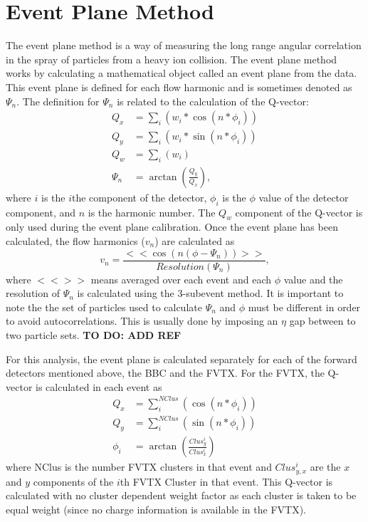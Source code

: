 \section{Event Plane Method}
The event plane method is a way of measuring the long range angular correlation in the spray of particles from a heavy ion collision. The event plane method works by calculating a mathematical object called an event plane
from the data. This event plane is defined for each flow harmonic and is sometimes denoted as $\Psi_n$. The definition for $\Psi_n$ is related to the calculation of the Q-vector:
\begin{align}
Q_x &= \sum_i( w_i * \cos(n * \phi_i)) \\
Q_y &= \sum_i( w_i * \sin(n * \phi_i)) \\
Q_w &= \sum_i( w_i ) \\
\Psi_n &= \arctan( \frac{Q_y}{Q_x} ),
\label{eqn:general_ep_math}
\end{align}
where $i$ is the $i$the component of the detector, $\phi_i$ is the $\phi$ value of the detector component, and $n$ is the harmonic number.
The $Q_w$ component of the Q-vector is only used during the event plane calibration.
Once the event plane has been calculated, the flow harmonics ($v_n$) are calculated as
\begin{equation}
v_n = \frac{<<\cos(n(\phi - \Psi_n))>>}{Resolution(\Psi_n)},
\end{equation}
where $<<>>$ means averaged over each event and each $\phi$ value and the resolution of $\Psi_n$ is calculated using the 3-subevent method. It is important to note the the set of particles used to calculate $\Psi_n$ and $\phi$ must be different in order to avoid
autocorrelations. This is usually done by imposing an $\eta$ gap between to two particle sets. \textbf{TO DO: ADD REF}

For this analysis, the event plane is calculated separately for each of the forward detectors mentioned above, the BBC and the FVTX.  For the FVTX, the Q-vector is calculated in each event as
\begin{align}
Q_x &= \sum^{NClus}_i( \cos(n * \phi_i)) \\
Q_y &= \sum^{NClus}_i( \sin(n * \phi_i)) \\
\phi_i &= \arctan(\frac{Clus_{y}^i}{Clus_{x}^i})
\end{align}
where NClus is the number FVTX clusters in that event and $Clus_{y,x}^i$ are the $x$ and $y$ components of the $i$th FVTX Cluster in that event. This Q-vector is calculated with no cluster dependent weight factor as each cluster is taken to be equal weight (since no charge information is available in the FVTX). 

